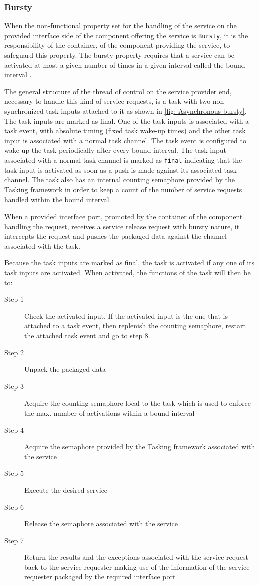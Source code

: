 \subsubsection{\textbf{Bursty}}
When the non-functional property set for the handling of the service on the provided interface side of the component offering the service is \texttt{Bursty}, it is the responsibility of the container, of the component providing the service, to safeguard this property. The bursty property requires that a service can be activated at most a given number of times in a given interval called the bound interval \cite{SpecMetamodel,CompBasedProcess}.

The general structure of the thread of control on the service provider end, necessary to handle this kind of service requests, is a task with two non-synchronized task inputs attached to it as shown in \cref{fig: Asynchronous bursty}. The task inputs are marked as final. One of the task inputs is associated with a task event, with absolute timing (fixed task wake-up times) and the other task input is associated with a normal task channel. The task event is configured to wake up the task periodically after every bound interval. The task input associated with a normal task channel is marked as \texttt{final} indicating that the task input is activated as soon as a push is made against its associated task channel. The task also has an internal counting semaphore provided by the Tasking framework in order to keep a count of the number of service requests handled within the bound interval.

When a provided interface port, promoted by the container of the component handling the request, receives a service release request with bursty nature, it intercepts the request and pushes the packaged data against the channel associated with the task.
  
Because the task inputs are marked as final, the task is activated if any one of its task inputs are activated. When activated, the functions of the task will then be to:

\begin{description}
\item [Step 1] Check the activated input. If the activated input is the one that is attached to a task event, then replenish the counting semaphore, restart the attached task event and go to step 8. 
\item [Step 2] Unpack the packaged data
\item [Step 3] Acquire the counting semaphore local to the task which is used to enforce the max. number of activations within a bound interval
\item [Step 4] Acquire the semaphore provided by the Tasking framework associated with the service
\item [Step 5] Execute the desired service
\item [Step 6] Release the semaphore associated with the service 
\item [Step 7]Return the results and the exceptions associated with the service request back to the service requester making use of the information of the service requester packaged by the required interface port 
\end{description}

